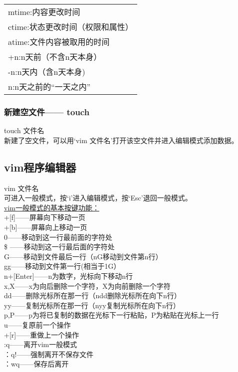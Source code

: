 \documentclass[12pt]{article}
\begin{document}
\begin{flushleft}
\begin{tabular}{|p{15cm}|}
\hline
mtime:内容更改时间\\
ctime:状态更改时间（权限和属性）\\
atime:文件内容被取用的时间\\
+n:n天前（不含n天本身）\\
-n:n天内（含n天本身)\\
n:n天之前的``一天之内”\\
\hline
\end{tabular}
\subsubsection{新建空文件——{} touch}
touch 文件名\\
新建了空文件，可以用`vim 文件名'打开该空文件并进入编辑模式添加数据。
\end{flushleft}
\subsection{vim程序编辑器}
\begin{flushleft}
vim 文件名\\
可进入一般模式，按`i'进入编辑模式，按`Esc'退回一般模式。\\
\underline{vim一般模式的基本按键功能：}\\
[Ctrl]+[f]——屏幕向下移动一页\\
[Ctrl]+[b]——屏幕向上移动一页\\
0——移动到这一行最前面的字符处\\
\${} ——移动到这一行最后面的字符处\\
G——移动到文件最后一行（nG移动到文件第n行）\\
gg——移动到文件第一行(相当于1G）\\
n+[Enter]——n为数字，光标向下移动n行\\
x,X——x为向后删除一个字符，X为向前删除一个字符\\
dd——删除光标所在那一行（ndd删除光标所在向下n行）\\
yy——复制光标所在那一行（nyy复制光标所在向下n行）\\
p,P——p为将已复制的数据在光标下一行粘贴，P为粘贴在光标上一行\\
u——复原前一个操作\\
[Ctrl]+[r]——重做上一个操作\\
:q——离开vim一般模式\\
：q!——强制离开不保存文件\\
：wq——保存后离开
\end{flushleft}














\end{document}
